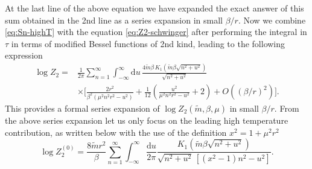 \documentclass[a4paper,11pt]{article}
\newcommand{\dd}{\mathrm d}
\begin{document}
At the last line of the above equation we have expanded the exact answer of this sum obtained in the 2nd line as a series expansion in small $\beta/r$.
Now we combine \eqref{eq:Sn-highT} with the equation \eqref{eq:Z2-schwinger} after performing the integral in $\tau$ in terms of modified Bessel functions of 2nd kind, leading to the following expression
\begin{align}
 \log Z_2
 ={}&\frac1{2\pi}\sum_{n=1}^{\infty}
 \int_{-\infty}^{\infty}\dd u\,
 \frac{4\tilde m\beta\,
 K_1\!\left(\tilde m\beta\sqrt{n^2+u^2}\right)}
 {\sqrt{n^2+u^2}}
 \nonumber\\
 &\times\Bigg[
 \frac{2r^2}{\beta^2(\mu^2n^2r^2-u^2)}
 +\frac1{12}\left(
 \frac{u^2}{\mu^2n^2r^2-u^2}+2
 \right)
 +O\!\left((\beta/r)^2\right)
 \Bigg].
 \label{eq:Z2-highT}
\end{align}
This provides a formal series expansion of $\log Z_2(\tilde m, \beta,\mu)$ in small $\beta/r$. 
From the above series expansion let us only focus on the leading high temperature contribution, as written below with the use of the definition $x^2=1+\mu^2r^2 $
\begin{equation}
 \log Z_{2}^{(0)}
 =\frac{8\tilde m r^2}{\beta}\sum_{n=1}^{\infty}
 \int_{-\infty}^{\infty}\frac{\dd u}{2\pi}
 \frac{K_1\!\left(\tilde m\beta\sqrt{n^2+u^2}\right)}
 {\sqrt{n^2+u^2}\,[(x^2-1)n^2-u^2]}.
 \label{eq:Z2-full-line}
\end{equation}
\end{document}
